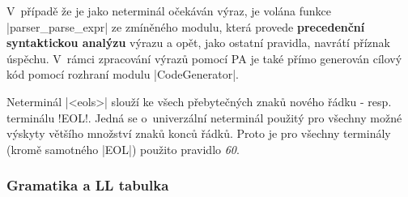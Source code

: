V~případě že je jako neterminál očekáván výraz, je volána funkce \ic|parser_parse_expr| ze zmíněného modulu, která provede \textbf{precedenční syntaktickou analýzu} výrazu a opět, jako ostatní pravidla, navrátí příznak úspěchu. V~rámci zpracování výrazů pomocí PA je také přímo generován cílový kód pomocí rozhraní modulu \ic|CodeGenerator|.

Neterminál \ic|<eols>| slouží ke  všech přebytečných znaků nového řádku - resp. terminálu \ic!EOL!. Jedná se o~univerzální neterminál použitý pro všechny možné výskyty většího množství znaků konců řádků. Proto je pro všechny terminály (kromě samotného \ic|EOL|) použito pravidlo \emph{60}.

\subsubsection{Gramatika a LL tabulka}
